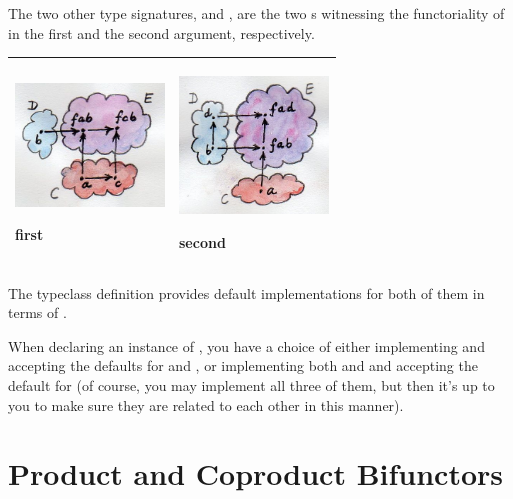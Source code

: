 \noindent
The two other type signatures,  and , are
the two s witnessing the functoriality of  in the
first and the second argument, respectively.

\begin{longtable}[]{@{}ll@{}}
\toprule
\begin{minipage}[t]{0.48\columnwidth}\raggedright\strut
\includegraphics[width=1.56250in]{images/first.jpg}

first\strut
\end{minipage} & \begin{minipage}[t]{0.48\columnwidth}\raggedright\strut
\hypertarget{attachment_4072}{}
\includegraphics[width=1.56250in]{images/second.jpg}

second\strut
\end{minipage}\tabularnewline
\bottomrule
\end{longtable}

\noindent
The typeclass definition provides default implementations for both of
them in terms of .

When declaring an instance of , you have a choice of
either implementing  and accepting the defaults for
 and , or implementing both 
and  and accepting the default for  (of
course, you may implement all three of them, but then it's up to you to
make sure they are related to each other in this manner).

\section{Product and Coproduct
Bifunctors}\label{product-and-coproduct-bifunctors}

